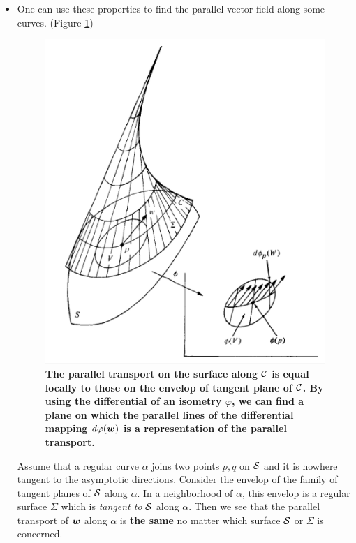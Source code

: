 \documentclass[11pt]{article}
\begin{document}
\begin{itemize}
\item One can use these properties to find the parallel vector field along some curves. (Figure \ref{fig: example_parallel_transport})
\begin{figure}[htb]
\centering
\begin{minipage}{0.6\linewidth}
 \centerline{\includegraphics[scale = 0.43]{para_transp3.png}}
\end{minipage}
\caption{\scriptsize
\textbf{The parallel transport on the surface along ${\mathcal C}$ is equal locally to those on the envelop of tangent plane of ${\mathcal C}$.  By using the differential of an isometry $\varphi$, we can find a plane on which the parallel lines of the differential mapping $d\varphi(\boldsymbol{w})$ is a representation of the parallel transport.   }}
\label{fig: example_parallel_transport}
\end{figure}

Assume that a regular curve $\alpha$ joins two points $p,q$ on ${\mathcal S}$ and it is nowhere tangent to the asymptotic directions. Consider the envelop of the family of tangent planes of ${\mathcal S}$ along $\alpha$. In a neighborhood of $\alpha$, this envelop is a regular surface $\Sigma$ which is \emph{tangent to} ${\mathcal S}$ along $\alpha$. Then we see that the parallel transport of $\boldsymbol{w}$ along $\alpha$ is \textbf{the same} no matter which surface ${\mathcal S}$ or $\Sigma$ is concerned. 


\end{itemize}
\end{document}
